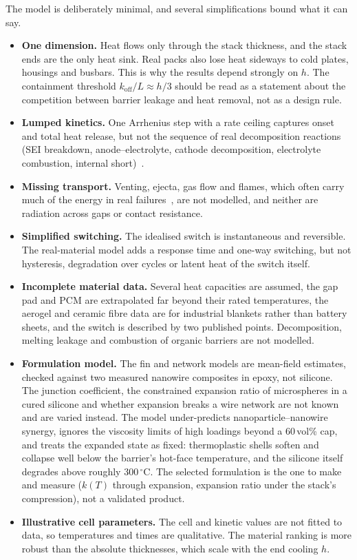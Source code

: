 \documentclass[11pt]{article}
\newcommand{\koff}{k_\mathrm{off}}
\begin{document}
The model is deliberately minimal, and several simplifications bound what it can say.
\begin{itemize}
  \item \textbf{One dimension.} Heat flows only through the stack thickness, and the
        stack ends are the only heat sink. Real packs also lose heat sideways to cold
        plates, housings and busbars. This is why the results depend strongly on $h$.
        The containment threshold $\koff/L \approx h/3$ should be read as a statement
        about the competition between barrier leakage and heat removal, not as a design
        rule.
  \item \textbf{Lumped kinetics.} One Arrhenius step with a rate ceiling captures onset
        and total heat release, but not the sequence of real decomposition reactions
        (SEI breakdown, anode--electrolyte, cathode decomposition, electrolyte
        combustion, internal short)~\cite{feng2018review,kim2007abuse}.
  \item \textbf{Missing transport.} Venting, ejecta, gas flow and flames, which often
        carry much of the energy in real failures~\cite{wang2012fire}, are not modelled,
        and neither are radiation across gaps or contact resistance.
  \item \textbf{Simplified switching.} The idealised switch is instantaneous and
        reversible. The real-material model adds a response time and one-way switching,
        but not hysteresis, degradation over cycles or latent heat of the switch itself.
  \item \textbf{Incomplete material data.} Several heat capacities are assumed, the gap
        pad and PCM are extrapolated far beyond their rated temperatures, the aerogel
        and ceramic fibre data are for industrial blankets rather than battery sheets,
        and the switch is described by two published points. Decomposition, melting
        leakage and combustion of organic barriers are not modelled.
  \item \textbf{Formulation model.} The fin and network models are mean-field estimates,
        checked against two measured nanowire composites in epoxy, not silicone. The
        junction coefficient, the constrained expansion ratio of microspheres in a cured
        silicone and whether expansion breaks a wire network are not known and are
        varied instead. The model under-predicts nanoparticle--nanowire synergy, ignores
        the viscosity limits of high loadings beyond a 60\,vol\% cap, and treats
        the expanded state as fixed: thermoplastic shells soften and collapse well
        below the barrier's hot-face temperature, and the silicone itself degrades
        above roughly 300\,$^\circ$C. The selected formulation is the one to make and
        measure ($k(T)$ through expansion, expansion ratio under the stack's
        compression), not a validated product.
  \item \textbf{Illustrative cell parameters.} The cell and kinetic values are not fitted
        to data, so temperatures and times are qualitative. The material ranking is more
        robust than the absolute thicknesses, which scale with the end cooling $h$.
\end{itemize}
\end{document}
